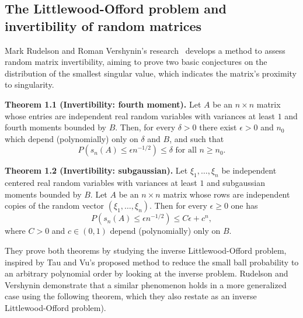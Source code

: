 \subsection{The Littlewood-Offord problem and invertibility of random matrices}

Mark Rudelson and Roman Vershynin's research~\cite{rudelson2008littlewood} develops a method to assess random matrix invertibility,  aiming to prove two basic conjectures on the distribution of the smallest singular value, which indicates the matrix's proximity to singularity.\newline

\textbf{Theorem 1.1 (Invertibility: fourth moment).} Let \(A\) be an \(n \times n\) matrix whose entries are independent real random variables with variances at least \(1\) and fourth moments bounded by \(B\). Then, for every \(\delta > 0\) there exist \(\epsilon > 0\) and \(n_0\) which depend (polynomially) only on \(\delta\) and \(B\), and such that
\begin{equation*}
    P(s_n(A) \leq \epsilon n^{-1/2}) \leq \delta \text{ for all } n \geq n_0.
\end{equation*}

\textbf{Theorem 1.2 (Invertibility: subgaussian).} Let \(\xi_1, \ldots, \xi_n\) be independent centered real random variables with variances at least \(1\) and subgaussian moments bounded by \(B\). Let \(A\) be an \(n \times n\) matrix whose rows are independent copies of the random vector \((\xi_1, \ldots, \xi_n)\). Then for every \(\epsilon \geq 0\) one has
\begin{equation*}
    P(s_n(A) \leq \epsilon n^{-1/2}) \leq C\epsilon + c^n,
\end{equation*}
where \(C > 0\) and \(c \in (0, 1)\) depend (polynomially) only on \(B\).\newline

They prove both theorems by studying the inverse Littlewood-Offord problem, inspired by Tau and Vu's proposed method to reduce the small ball probability to an arbitrary polynomial order by looking at the inverse problem. Rudelson and Vershynin demonstrate that a similar phenomenon holds in a more generalized case using the following theorem, which they also restate as an inverse Littlewood-Offord problem).\newline

